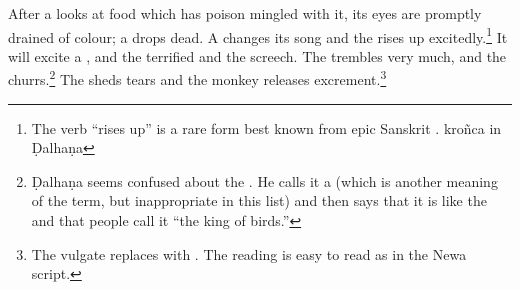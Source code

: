 \begin{translation}

After a  looks at
food which has poison mingled with it, its eyes are promptly drained of colour; a
 drops dead.  A  changes its song and the 
rises up excitedly.\footnote{The verb  “rises up” is a rare form
best known from epic Sanskrit \citep[see][212, \S 7.6.1]{ober-2003}. kroñca in
Ḍalhaṇa}  It will excite a , and the terrified  and the  screech. The
 trembles very much, and the  
    churrs.\footnote{Ḍalhaṇa 
    seems
confused about the .  He calls it a  
(which is
another meaning of the term, but inappropriate in this list) and then says that it
is like the  and that people call it “the king of birds.”} The
  sheds tears and the monkey releases 
excrement.\footnote{The
vulgate replaces  with .  The reading
 is easy to read as  in the Newa script.}
 
    \end{translation}